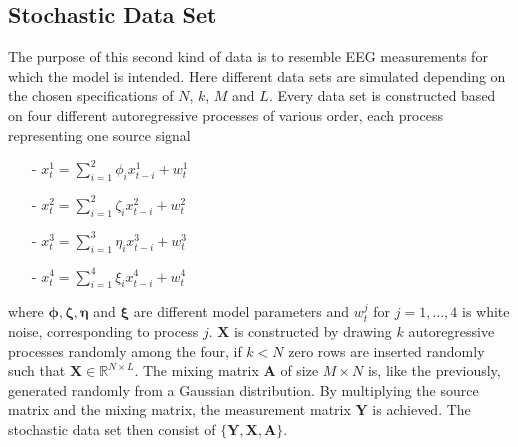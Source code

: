 \subsection{Stochastic Data Set}\label{sec:stoch_data}
The purpose of this second kind of data is to resemble EEG measurements for which the model is intended. 
Here different data sets are simulated depending on the chosen specifications of $N$, $k$, $M$ and $L$. 
Every data set is constructed based on four different autoregressive processes of various order, each process representing one source signal
\begin{itemize}
\item[-] $x_{t}^{1} = \sum_{i=1}^{2} \phi_i x_{t-i}^{1} + w_t^{1}$
\item[-] $x_{t}^{2} = \sum_{i=1}^{2} \zeta_i x_{t-i}^{2} + w_t^{2}$
\item[-] $x_{t}^{3} = \sum_{i=1}^{3} \eta_i x_{t-i}^{3} + w_t^{3}$
\item[-] $x_{t}^{4} = \sum_{i=1}^{4} \xi_i x_{t-i}^{4} + w_t^{4}$
\end{itemize}
where $\boldsymbol{\phi}, \boldsymbol{\zeta}, \boldsymbol{\eta}$ and $\boldsymbol{\xi}$ are different model parameters and $w_t^{j}$ for $j = 1,\hdots ,4$ is white noise, corresponding to process $j$.
$\mathbf{X}$ is constructed by drawing $k$ autoregressive processes randomly among the four, if $k < N$ zero rows are inserted randomly such that $\mathbf{X} \in \mathbb{R}^{N \times L}$.  
The mixing matrix $\mathbf{A}$ of size $M \times N$ is, like the previously, generated randomly from a Gaussian distribution.
By multiplying the source matrix and the mixing matrix, the measurement matrix $\mathbf{Y}$ is achieved.
The stochastic data set then consist of $\{ \mathbf{Y}, \mathbf{X}, \mathbf{A} \}$. 

